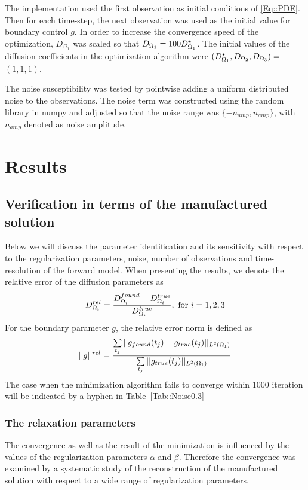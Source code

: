 \documentclass[12pt,a4paper]{article}
\begin{document}
The implementation used the first observation as initial conditions of \eqref{Eq::PDE}. Then for each time-step, the next observation was used as the initial value for boundary control $g$. In order to increase the convergence speed of the optimization, $D_{\Omega_1}$ was scaled so that $D_{\Omega_1} = 100 D_{\Omega_1}\sp{\star} $. The initial values of the diffusion coefficients in the optimization algorithm were $(D_{\Omega_1}\sp{\star}, D_{\Omega_2}, D_{\Omega_3})=$  $(1, 1, 1)$. 

The noise susceptibility was tested by pointwise adding a uniform distributed noise to the observations. The noise term was constructed using the random library in numpy and adjusted so that the noise range was $\lbrace -n_{amp} , n_{amp} \rbrace $, with $n_{amp}$ denoted as noise amplitude.


\section{Results}
\subsection{Verification in terms of the manufactured solution}
Below we will discuss the parameter identification and its sensitivity with respect to the regularization parameters, noise, number of observations and time-resolution of the forward model. When presenting the results, we denote the relative error of the diffusion parameters as 
\begin{equation}
 D_{\Omega_i}\sp{rel} = \frac{D_{\Omega_i}\sp{found} -D_{\Omega_i}\sp{true} }{D_{\Omega_i}\sp{true} }, \text{ for } i=1,2,3
\end{equation}
For the boundary parameter $g$, the relative error norm is defined as 
\begin{equation}
|| g ||\sp{rel} = \frac{ \sum\limits_{t_j} || g_{found}(t_j) -g_{true}(t_j)||_{L^2(\Omega_1)} }{  \sum\limits_{t_j}||g_{true}(t_j)||_{L^2(\Omega_1)} }
\end{equation}
The case when the minimization algorithm fails to converge within 1000 iteration will be indicated by a hyphen in Table~\ref{Tab::Noise0.3}



\subsubsection{The relaxation parameters}
The convergence as well as the result of the minimization is influenced by the values of the regularization parameters $\alpha$ and $\beta$. Therefore the convergence was examined by a systematic study of the reconstruction of the manufactured solution with respect to a wide range of regularization parameters. 
\end{document}
